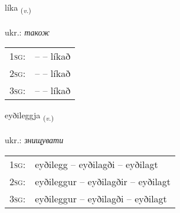\documentclass[frontgrid, backgrid]{flacards}\usepackage[]{graphicx}\usepackage[]{xcolor}
\begin{document}
\renewcommand{\flhead}{\vskip5pt \fboxsep=0pt {\small\bfseries\footnotesize Sagnorð | дієслово}}
\renewcommand{\fcfoot}{\vskip5pt \fboxsep=0pt \hspace{2pt}{\small\bfseries\footnotesize 3K}}

\renewcommand{\blhead}{\vskip5pt {\small\bfseries\footnotesize Sagnorð | дієслово }}
\renewcommand{\bcfoot}{\vskip5pt \hspace{2pt}{\small\bfseries\footnotesize 3K}}


{líka \small{\textsubscript{(\textit{v.})}} \\[1ex] %
\textphonetic{[liːka]} \\
ukr.: \emph{також} \\  [2ex]
\renewcommand*{\arraystretch}{0.8}
\begin{tabular}{p{1cm}l}
\textsc{1sg}: &  --  -- líkað \\ 
\textsc{2sg}: &  --  -- líkað \\ 
\textsc{3sg}: &  --  -- líkað \\ 
\end{tabular}
}

\renewcommand{\flhead}{\vskip5pt \fboxsep=0pt {\small\bfseries\footnotesize Sagnorð | дієслово}}
\renewcommand{\fcfoot}{\vskip5pt \fboxsep=0pt \hspace{2pt}{\small\bfseries\footnotesize 3K}}

\renewcommand{\blhead}{\vskip5pt {\small\bfseries\footnotesize Sagnorð | дієслово }}
\renewcommand{\bcfoot}{\vskip5pt \hspace{2pt}{\small\bfseries\footnotesize 3K}}


{eyðileggja \small{\textsubscript{(\textit{v.})}} \\[1ex] %
\textphonetic{[eiːðɪlɛca]} \\
ukr.: \emph{знищувати} \\  [2ex]
\renewcommand*{\arraystretch}{0.8}
\begin{tabular}{p{1cm}l}
\textsc{1sg}: & eyðilegg -- eyðilagði -- eyðilagt \\ 
\textsc{2sg}: & eyðileggur -- eyðilagðir -- eyðilagt \\ 
\textsc{3sg}: & eyðileggur -- eyðilagði -- eyðilagt \\ 
\end{tabular}
}
\end{document}
